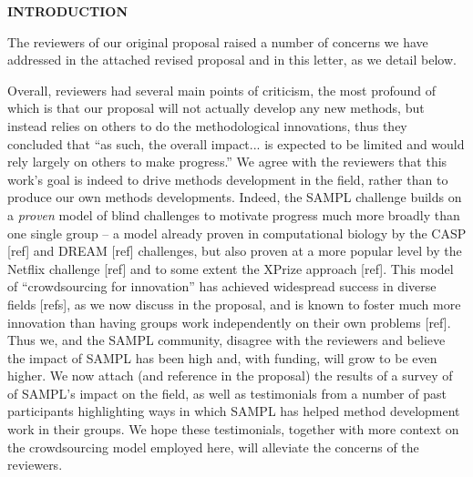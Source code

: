 \documentclass[11pt]{article}
\begin{document}



\begin{centering}
{\bf INTRODUCTION}
\end{centering}

The reviewers of our original proposal raised a number of concerns we have addressed in the attached revised proposal and in this letter, as we detail below.

Overall, reviewers had several main points of criticism, the most profound of which is that our proposal will not actually develop any new methods, but instead relies on others to do the methodological innovations, thus they concluded that ``as such, the overall impact... is expected to be limited and would rely largely on others to make progress.''
We agree with the reviewers that this work's goal is indeed to drive methods development in the field, rather than to produce our own methods developments.
Indeed, the SAMPL challenge builds on a \emph{proven} model of blind challenges to motivate progress much more broadly than one single group -- a model already proven in computational biology by the CASP [ref] and DREAM [ref] challenges, but also proven at a more popular level by the Netflix challenge [ref] and to some extent the XPrize approach [ref]. 
This model of ``crowdsourcing for innovation'' has achieved widespread success in diverse fields [refs], as we now discuss in the proposal, and is known to foster much more innovation than having groups work independently on their own problems [ref].
Thus we, and the SAMPL community, disagree with the reviewers and believe the impact of SAMPL has been high and, with funding, will grow to be even higher. 
We now attach (and reference in the proposal) the results of a survey of of SAMPL's impact on the field, as well as testimonials from a number of past participants highlighting ways in which SAMPL has helped method development work in their groups.
We hope these testimonials, together with more context on the crowdsourcing model employed here, will alleviate the concerns of the reviewers. 
\end{document}
